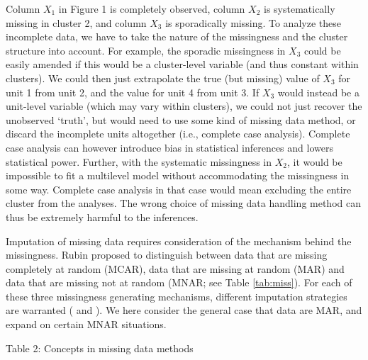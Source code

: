 \documentclass[
  article]{jss}
\begin{document}
Column \(X_1\) in Figure 1 is completely observed, column \(X_2\) is
systematically missing in cluster 2, and column \(X_3\) is sporadically
missing. To analyze these incomplete data, we have to take the nature of
the missingness and the cluster structure into account. For example, the
sporadic missingness in \(X_3\) could be easily amended if this would be
a cluster-level variable (and thus constant within clusters). We could
then just extrapolate the true (but missing) value of \(X_3\) for unit 1
from unit 2, and the value for unit 4 from unit 3. If \(X_3\) would
instead be a unit-level variable (which may vary within clusters), we
could not just recover the unobserved `truth', but would need to use
some kind of missing data method, or discard the incomplete units
altogether (i.e., complete case analysis). Complete case analysis can
however introduce bias in statistical inferences and lowers statistical
power. Further, with the systematic missingness in \(X_2\), it would be
impossible to fit a multilevel model without accommodating the
missingness in some way. Complete case analysis in that case would mean
excluding the entire cluster from the analyses. The wrong choice of
missing data handling method can thus be extremely harmful to the
inferences.

Imputation of missing data requires consideration of the mechanism
behind the missingness. Rubin proposed to distinguish between data that
are missing completely at random (MCAR), data that are missing at random
(MAR) and data that are missing not at random (MNAR; see Table
\ref{tab:miss}). For each of these three missingness generating
mechanisms, different imputation strategies are warranted
(\citet{yuce08} and \citet{hox15}). We here consider the general case
that data are MAR, and expand on certain MNAR situations.

Table 2: Concepts in missing data methods
\end{document}
